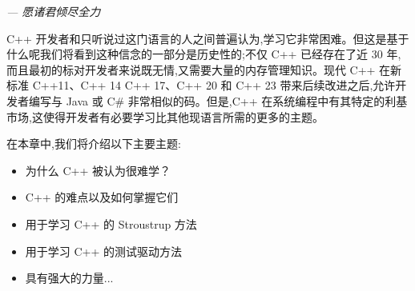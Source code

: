 \begin{flushright}
\textit{--- 愿诸君倾尽全力}
\end{flushright}

C++ 开发者和只听说过这门语言的人之间普遍认为,学习它非常困难。但这是基于什么呢我们将看到这种信念的一部分是历史性的;不仅 C++ 已经存在了近 30 年,而且最初的标对开发者来说既无情,又需要大量的内存管理知识。现代 C++ 在新标准 C++11、C++ 14 C++ 17、C++ 20 和 C++ 23 带来后续改进之后,允许开发者编写与 Java 或 C\# 非常相似的码。但是,C++ 在系统编程中有其特定的利基市场,这使得开发者有必要学习比其他现语言所需的更多的主题。

在本章中,我们将介绍以下主要主题:

\begin{itemize}
\item 
为什么 C++ 被认为很难学？

\item 
C++ 的难点以及如何掌握它们

\item 
用于学习 C++ 的 Stroustrup 方法

\item 
用于学习 C++ 的测试驱动方法

\item 
具有强大的力量...
\end{itemize}



